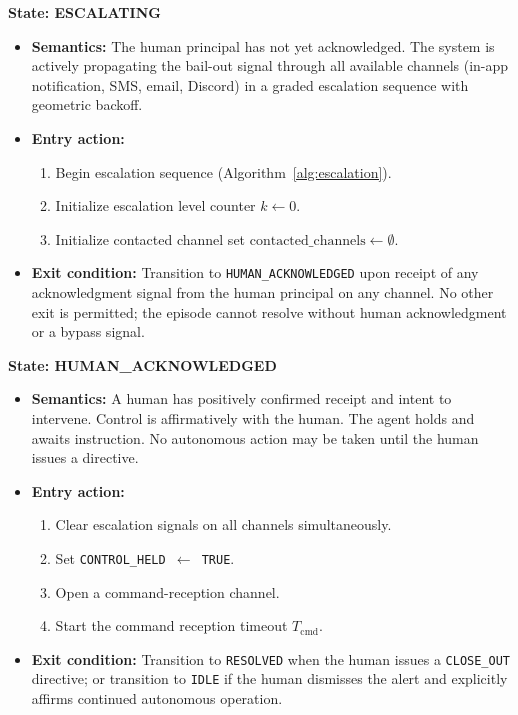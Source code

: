 \bigskip

\noindent\textbf{State: ESCALATING}

\begin{itemize}
  \item \textbf{Semantics:} The human principal has not yet acknowledged. The system is actively propagating the bail-out signal through all available channels (in-app notification, SMS, email, Discord) in a graded escalation sequence with geometric backoff.
  \item \textbf{Entry action:}
    \begin{enumerate}
      \item Begin escalation sequence (Algorithm~\ref{alg:escalation}).
      \item Initialize escalation level counter $k \gets 0$.
      \item Initialize contacted channel set $\text{contacted\_channels} \gets \emptyset$.
    \end{enumerate}
  \item \textbf{Exit condition:} Transition to \texttt{HUMAN\_ACKNOWLEDGED} upon receipt of any acknowledgment signal from the human principal on any channel. No other exit is permitted; the episode cannot resolve without human acknowledgment or a bypass signal.
\end{itemize}

\bigskip

\noindent\textbf{State: HUMAN\_ACKNOWLEDGED}

\begin{itemize}
  \item \textbf{Semantics:} A human has positively confirmed receipt and intent to intervene. Control is affirmatively with the human. The agent holds and awaits instruction. No autonomous action may be taken until the human issues a directive.
  \item \textbf{Entry action:}
    \begin{enumerate}
      \item Clear escalation signals on all channels simultaneously.
      \item Set \texttt{CONTROL\_HELD $\gets$ TRUE}.
      \item Open a command-reception channel.
      \item Start the command reception timeout $T_{\text{cmd}}$.
    \end{enumerate}
  \item \textbf{Exit condition:} Transition to \texttt{RESOLVED} when the human issues a \texttt{CLOSE\_OUT} directive; or transition to \texttt{IDLE} if the human dismisses the alert and explicitly affirms continued autonomous operation.
\end{itemize}

